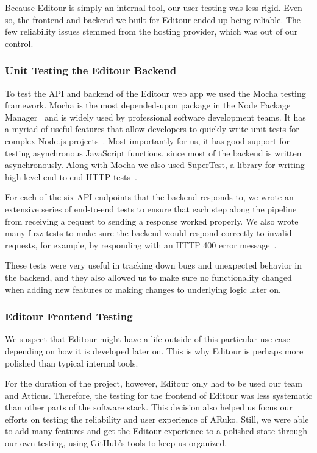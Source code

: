 \documentclass[a4paper, 10pt, american, titlepage]{article}
\begin{document}
Because Editour is simply an internal tool, our user testing was less rigid.
Even so, the frontend and backend we built for Editour ended up being reliable.
The few reliability issues stemmed from the hosting provider, which was out of
our control.

\subsubsection{Unit Testing the Editour Backend}
\label{sec:unitTestingTheEditourBackend}

To test the API and backend of the Editour web app we used the Mocha testing
framework. Mocha is the most depended-upon package in the Node Package
Manager~\autocite{tidelift2019} and is widely used by professional software
development teams. It has a myriad of useful features that allow developers to
quickly write unit tests for complex Node.js projects~\autocite{mochajs2019}.
Most importantly for us, it has good support for testing asynchronous JavaScript
functions, since most of the backend is written asynchronously. Along with Mocha
we also used SuperTest, a library for writing high-level end-to-end HTTP
tests~\autocite{supertest2019}.

For each of the six API endpoints that the backend responds to, we wrote an
extensive series of end-to-end tests to ensure that each step along the pipeline
from receiving a request to sending a response worked properly. We also wrote
many fuzz tests to make sure the backend would respond correctly to invalid
requests, for example, by responding with an HTTP 400 error
message~\autocite{rfc7231}.

These tests were very useful in tracking down bugs and unexpected behavior in
the backend, and they also allowed us to make sure no functionality changed when
adding new features or making changes to underlying logic later on.

\subsubsection{Editour Frontend Testing}
\label{sec:editourFrontendTesting}

We suspect that Editour might have a life outside of this particular use case
depending on how it is developed later on. This is why Editour is perhaps more
polished than typical internal tools.

For the duration of the project, however, Editour only had to be used our team
and Atticus. Therefore, the testing for the frontend of Editour was less
systematic than other parts of the software stack. This decision also helped us
focus our efforts on testing the reliability and user experience of ARuko.
Still, we were able to add many features and get the Editour experience to a
polished state through our own testing, using GitHub's tools to keep us
organized.
\end{document}
